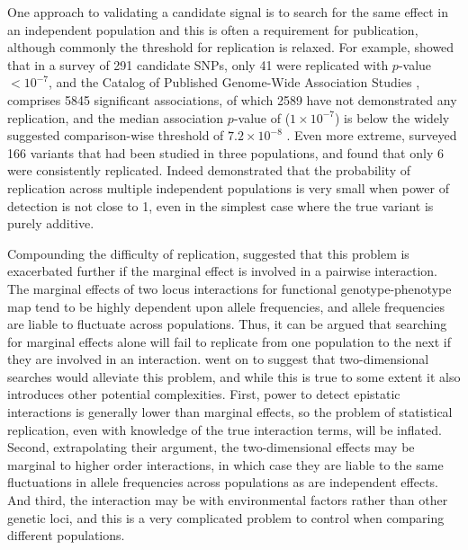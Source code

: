 One approach to validating a candidate signal is to search for the same effect in an independent population and this is often a requirement for publication, although commonly the threshold for replication is relaxed. For example, \citet{Siontis2010} showed that in a survey of 291 candidate SNPs, only 41 were replicated with $p$-value $< 10^{-7}$, and the Catalog of Published Genome-Wide Association Studies \citep{Hindorff2010}, comprises 5845 significant associations, of which 2589 have not demonstrated any replication, and the median association $p$-value of ($1\times10^{-7}$) is below the widely suggested comparison-wise threshold of $7.2\times10^{-8}$ \citep{Dudbridge2008}. Even more extreme, \citet{Hirschhorn2002} surveyed 166 variants that had been studied in three populations, and found that only 6 were consistently replicated. Indeed \citet{Liu2008} demonstrated that the probability of replication across multiple independent populations is very small when power of detection is not close to 1, even in the simplest case where the true variant is purely additive.

Compounding the difficulty of replication, \citet{Greene2009} suggested that this problem is exacerbated further if the marginal effect is involved in a pairwise interaction. The marginal effects of two locus interactions for functional genotype-phenotype map tend to be highly dependent upon allele frequencies, and allele frequencies are liable to fluctuate across populations. Thus, it can be argued that searching for marginal effects alone will fail to replicate from one population to the next if they are involved in an interaction. \citet{Greene2009} went on to suggest that two-dimensional searches would alleviate this problem, and while this is true to some extent it also introduces other potential complexities. First, power to detect epistatic interactions is generally lower than marginal effects, so the problem of statistical replication, even with knowledge of the true interaction terms, will be inflated. Second, extrapolating their argument, the two-dimensional effects may be marginal to higher order interactions, in which case they are liable to the same fluctuations in allele frequencies across populations as are independent effects. And third, the interaction may be with environmental factors rather than other genetic loci, and this is a very complicated problem to control when comparing different populations.

